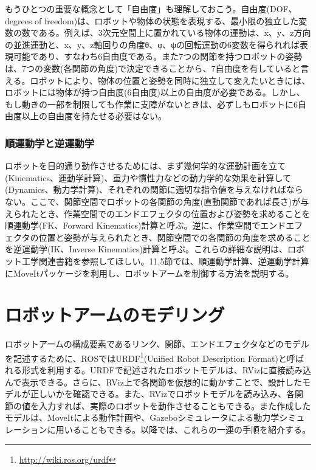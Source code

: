 もうひとつの重要な概念として「自由度」も理解しておこう。自由度(DOF、degrees of freedom)は、ロボットや物体の状態を表現する、最小限の独立した変数の数である。例えば、3次元空間上に置かれている物体の運動は、x、y、z方向の並進運動と、x、y、z軸回りの角度θ、φ、ψの回転運動の6変数を得られれば表現可能であり、すなわち6自由度である。また7つの関節を持つロボットの姿勢は、7つの変数(各関節の角度)で決定できることから、7自由度を有していると言える。ロボットにより、物体の位置と姿勢を同時に独立して変えたいときには、ロボットには物体が持つ自由度(6自由度)以上の自由度が必要である。しかし、もし動きの一部を制限しても作業に支障がないときは、必ずしもロボットに6自由度以上の自由度を持たせる必要はない。

\subsubsection{順運動学と逆運動学}

ロボットを目的通り動作させるためには、まず幾何学的な運動計画を立て(Kinematics、運動学計算)、重力や慣性力などの動力学的な効果を計算して(Dynamics、動力学計算)、それぞれの関節に適切な指令値を与えなければならない。ここで、関節空間でロボットの各関節の角度(直動関節であれば長さ)が与えられたとき、作業空間でのエンドエフェクタの位置および姿勢を求めることを順運動学(FK、Forward Kinematics)計算と呼ぶ。逆に、作業空間でエンドエフェクタの位置と姿勢が与えられたとき、関節空間での各関節の角度を求めることを逆運動学(IK、Inverse Kinematics)計算と呼ぶ。これらの詳細な説明は、ロボット工学関連書籍を参照してほしい。11.5節では、順運動学計算、逆運動学計算にMoveItパッケージを利用し、ロボットアームを制御する方法を説明する。

\section{ロボットアームのモデリング}

ロボットアームの構成要素であるリンク、関節、エンドエフェクタなどのモデルを記述するために、ROSではURDF\footnote{\url{http://wiki.ros.org/urdf}}(Unified Robot Description Format)と呼ばれる形式を利用する。URDFで記述されたロボットモデルは、RVizに直接読み込んで表示できる。さらに、RViz上で各関節を仮想的に動かすことで、設計したモデルが正しいかを確認できる。また、RVizでロボットモデルを読み込み、各関節の値を入力すれば、実際のロボットを動作させることもできる。また作成したモデルは、MoveItによる動作計画や、Gazeboシミュレータによる動力学シミュレーションに用いることもできる。以降では、これらの一連の手順を紹介する。

